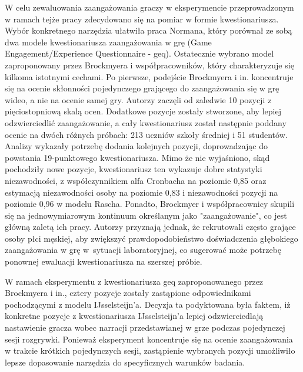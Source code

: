 W celu zewaluowania zaangażowania graczy w eksperymencie przeprowadzonym w ramach tejże pracy
zdecydowano się na pomiar w formie kwestionariusza.
Wybór konkretnego narzędzia ułatwiła praca Normana\cite{geq}, który porównał ze sobą dwa modele kwestionariusza
zaangażowania w grę (Game Engagement/Experience Questionnaire - \gls{geq})\cite{development_of_game}\cite{game_exp_quest}. Ostatecznie wybrano model
zaproponowany przez Brockmyera i współpracowników\cite{development_of_game}, który charakteryzuje się kilkoma istotnymi cechami.
Po pierwsze, podejście Brockmyera i in.\cite{development_of_game} koncentruje się na ocenie skłonności pojedynczego grającego do
zaangażowania się w grę wideo, a nie na ocenie samej gry\cite{geq}. Autorzy\cite{development_of_game} zaczęli od
zaledwie 10 pozycji z pięciostopniową skalą ocen. Dodatkowe pozycje zostały stworzone, aby lepiej
odzwierciedlić zaangażowanie, a cały kwestionariusz został następnie poddany ocenie na dwóch różnych próbach: 213 uczniów szkoły
średniej i 51 studentów. Analizy wykazały potrzebę dodania kolejnych pozycji, doprowadzając do powstania
19-punktowego kwestionariusza. Mimo że nie wyjaśniono, skąd pochodziły nowe pozycje, kwestionariusz ten
wykazuje dobre statystyki niezawodności\cite{geq}, z współczynnikiem alfa Cronbacha na poziomie 0,85 oraz estymacją
niezawodności osoby na poziomie 0,83 i niezawodności pozycji na poziomie 0,96 w modelu Rascha\cite{development_of_game}.
Ponadto, Brockmyer i współpracownicy\cite{development_of_game}
skupili się na jednowymiarowym kontinuum określanym jako "zaangażowanie", co jest główną zaletą ich
pracy\cite{geq}. Autorzy przyznają jednak, że rekrutowali często grające osoby płci męskiej,
aby zwiększyć prawdopodobieństwo doświadczenia głębokiego zaangażowania w grę w~sytuacji
laboratoryjnej, co sugerować może potrzebę ponownej ewaluacji kwestionariusza na szerszej próbie\cite{geq}.

W ramach eksperymentu z kwestionariusza \gls{geq} zaproponowanego przez Brockmyera i in.\cite{development_of_game}, cztery
pozycje zostały zastąpione odpowiednikami pochodzącymi z modelu IJsselsteijn'a\cite{game_exp_quest}. Decyzja ta podyktowana
była faktem, iż konkretne pozycje z kwestionariusza IJsselsteijn'a\cite{game_exp_quest} lepiej odzwierciedlają nastawienie gracza wobec
narracji przedstawianej w grze podczas pojedynczej sesji rozgrywki. Ponieważ eksperyment koncentruje się na ocenie
zaangażowania w trakcie krótkich pojedynczych sesji, zastąpienie wybranych pozycji umożliwiło lepsze
dopasowanie narzędzia do specyficznych warunków badania.

